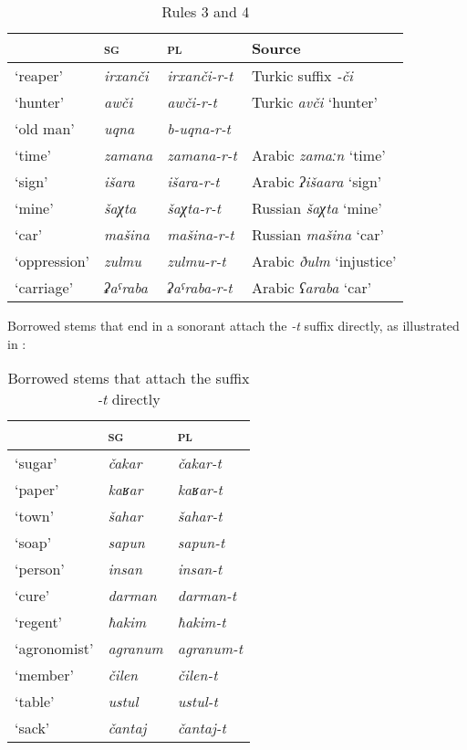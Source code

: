 ﻿\documentclass[output=paper]{langsci/langscibook}
\begin{document}
\begin{table}

   \caption{Rules 3 and 4} \label{tab:3:4}
 \begin{tabular}{@{}llll@{}}
 \toprule
 & \textsc{sg} & \textsc{pl} & {Source}\tabularnewline \midrule %
`reaper' & \emph{irxanči} & \emph{irxanči-r-t} & Turkic suffix
\emph{-či}\tabularnewline
`hunter' & \emph{awči} & \emph{awči-r-t} & Turkic \emph{avči}
`hunter'\tabularnewline %
`old man' & \emph{uqna} & \emph{b-uqna-r-t}\footnotemark &\tabularnewline
`time' & \emph{zamana} & \emph{zamana-r-t} & Arabic \emph{zamaːn}
`time'\tabularnewline
`sign' & \emph{išara} & \emph{išara-r-t} & Arabic \emph{ʔišaara}
`sign'\tabularnewline
`mine' & \emph{šaχta} & \emph{šaχta-r-t} & Russian \emph{šaχta} `mine'\tabularnewline
`car' & \emph{mašina} & \emph{mašina-r-t} & Russian \emph{mašina} `car'\tabularnewline
`oppression' & \emph{zulmu} & \emph{zulmu-r-t} & Arabic \emph{ðulm}
`injustice'\tabularnewline
`carriage' & \emph{ʡaˤraba} & \emph{ʡaˤraba-r-t} & Arabic \emph{ʕaraba}
`car'\tabularnewline
\bottomrule
  \end{tabular}

\end{table}


\pagebreak


Borrowed stems that end in a sonorant attach the \emph{-t} suffix
directly, as illustrated in :



\begin{table}[H]
  \caption{Borrowed stems that attach the suffix \emph{-t} directly}\label{tab:3:5}
  
\begin{tabular}{@{}lll@{}}
\toprule
& \textsc{sg} & \textsc{pl}\tabularnewline \midrule
`sugar' & \emph{čakar} & \emph{čakar-t}\tabularnewline
`paper' & \emph{kaʁar} & \emph{kaʁar-t}\tabularnewline
`town' & \emph{šahar} & \emph{šahar-t}\tabularnewline
`soap' & \emph{sapun} & \emph{sapun-t}\tabularnewline
`person' & \emph{insan} & \emph{insan-t}\tabularnewline
`cure' & \emph{darman} & \emph{darman-t}\tabularnewline
`regent' & \emph{ħakim} & \emph{ħakim-t}\tabularnewline
`agronomist' & \emph{agranum} & \emph{agranum-t}\tabularnewline
`member' & \emph{čilen} & \emph{čilen-t}\tabularnewline
`table' & \emph{ustul} & \emph{ustul-t}\tabularnewline
`sack' & \emph{čantaj} & \emph{čantaj-t}\tabularnewline
\bottomrule
\end{tabular}
\end{table}
\end{document}
